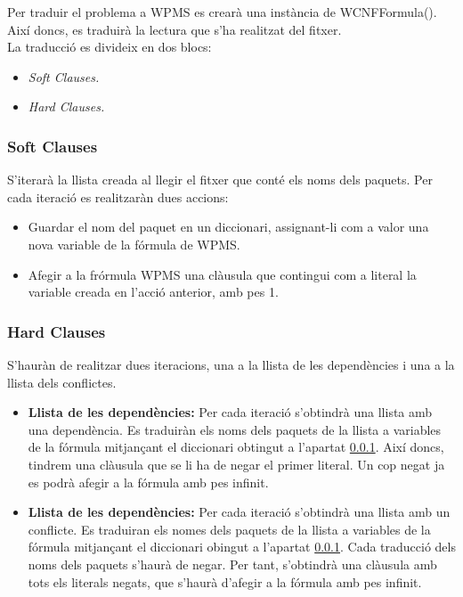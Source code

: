 \documentclass[../informe.tex]{subfiles}
\begin{document}
Per traduir el problema a WPMS es crearà una instància de WCNFFormula(). Així doncs, es traduirà la lectura que s'ha realitzat del fitxer. \\

La traducció es divideix en dos blocs:
\begin{itemize}
  \item \textit{Soft Clauses.}
  \item \textit{Hard Clauses.}
\end{itemize}

\subsubsection{Soft Clauses}
\label{sections:soft_clauses}
S'iterarà la llista creada al llegir el fitxer que conté els noms dels paquets. Per cada iteració es realitzaràn dues accions:
\begin{itemize}
  \item Guardar el nom del paquet en un diccionari, assignant-li com a valor una nova variable de la fórmula de WPMS.
  \item Afegir a la frórmula WPMS una clàusula que contingui com a literal la variable creada en l'acció anterior, amb pes 1.
\end{itemize}

\subsubsection{Hard Clauses}
S'hauràn de realitzar dues iteracions, una a la llista de les dependències i una a la llista dels conflictes. \\
\begin{itemize}
  \item \textbf{Llista de les dependències:} Per cada iteració s'obtindrà una llista amb una dependència. Es traduiràn els noms dels paquets de la llista a variables de la fórmula mitjançant el diccionari obtingut a l'apartat \ref{sections:soft_clauses}. Així doncs, tindrem una clàusula que se li ha de negar el primer literal. Un cop negat ja es podrà afegir a la fórmula amb pes infinit. \\
  \item \textbf{Llista de les dependències:} Per cada iteració s'obtindrà una llista amb un conflicte. Es traduiran els nomes dels paquets de la llista a variables de la fórmula mitjançant el diccionari obingut a l'apartat \ref{sections:soft_clauses}. Cada traducció dels noms dels paquets s'haurà de negar. Per tant, s'obtindrà una clàusula amb tots els literals negats, que s'haurà d'afegir a la fórmula amb pes infinit.
\end{itemize}
\end{document}
